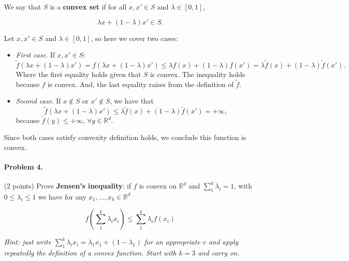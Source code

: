 \documentclass[12pt]{scrartcl}
\begin{document}
We say that $S$ is a \textbf{convex set} if for all $x, x' \in S$ and $\lambda \in [0,1]$,

\begin{equation*}
    \lambda x + (1 - \lambda) x' \in S.
\end{equation*}

Let $x, x' \in S$ and $\lambda \in [0,1]$, so here we cover two cases:

\begin{itemize}
    \item \textit{First case}. If $x, x' \in S$:
    \begin{equation*}
        \tilde f (\lambda x + (1- \lambda)x') = f (\lambda x + (1- \lambda)x')  \leq \lambda f(x) + (1-\lambda)f(x') = \lambda \tilde f(x) + (1-\lambda)\tilde f(x').
    \end{equation*}
    Where the first equality holds given that $S$ is convex. The inequality holds because $f$ is convex. And, the last equality raises from the definition of $\tilde f$.

    \item \textit{Second case}. If $x \notin S$ or $x' \notin S$, we have that
    \begin{equation*}
        \tilde f (\lambda x + (1- \lambda)x') \leq \lambda \tilde f (x) + (1 - \lambda) \tilde f (x') = + \infty,
    \end{equation*}
    because $\tilde f (y) \leq + \infty$, $\forall y \in \mathbb{R}^d$.
\end{itemize}

Since both cases satisfy convexity definition holds, we conclude this function is convex.





\begin{boxF}
\paragraph*{Problem 4.} (2 points) \hspace{0.15em} Prove \textbf{Jensen's inequality}: if $f$ is convex on $\mathbb{R}^d$ and $\sum_1^k \lambda_i = 1$, with $0 \leq \lambda_i \leq 1$ we have for any $x_1, ..., x_k \in \mathbb{R}^d$

    $$
    f\left(\sum_1^k \lambda_i x_i\right) \leq \sum_1^k \lambda_i f(x_i)
    $$

\textit{Hint: just write $\sum_1^k \lambda_i x_i = \lambda_1 x_1 + \left( 1 - \lambda_1\right)$ for an appropriate $v$ and apply repeatedly the definition of a convex function. Start with $k = 3$ and carry on.}

\end{boxF}
\end{document}
